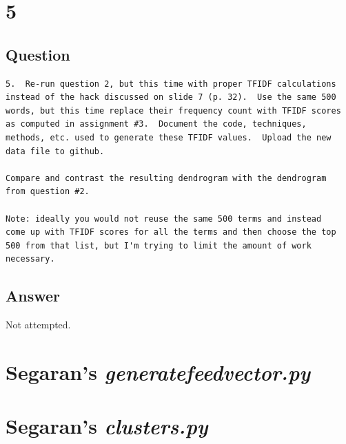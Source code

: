 \documentclass[letterpaper,11pt]{article}
\begin{document}
\clearpage

\newpage

\section*{5}

\subsection*{Question}

\begin{verbatim}
5.  Re-run question 2, but this time with proper TFIDF calculations
instead of the hack discussed on slide 7 (p. 32).  Use the same 500
words, but this time replace their frequency count with TFIDF scores
as computed in assignment #3.  Document the code, techniques,
methods, etc. used to generate these TFIDF values.  Upload the new
data file to github.

Compare and contrast the resulting dendrogram with the dendrogram
from question #2.

Note: ideally you would not reuse the same 500 terms and instead
come up with TFIDF scores for all the terms and then choose the top
500 from that list, but I'm trying to limit the amount of work
necessary.
\end{verbatim}

\subsection*{Answer}
Not attempted.


\clearpage
\appendix
\section{Segaran's \emph{generatefeedvector.py}}



\clearpage
\section{Segaran's \emph{clusters.py}}




\clearpage


\end{document}
